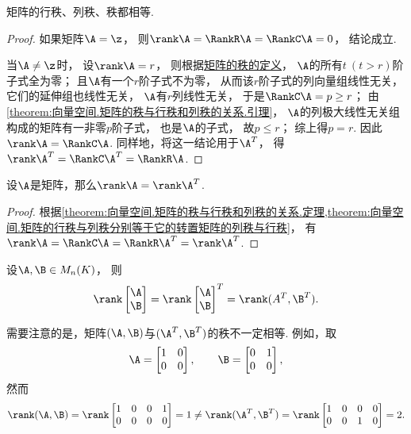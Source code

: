 \begin{theorem}\label{theorem:向量空间.矩阵的秩与行秩和列秩的关系.定理}
矩阵的行秩、列秩、秩都相等.
\begin{proof}
如果矩阵\(\A = \z\)，
则\(\rank\A=\RankR\A=\RankC\A=0\)，
结论成立.

当\(\A\neq\z\)时，
设\(\rank\A=r\)，
则根据\hyperref[definition:线性方程组.矩阵的秩的定义]{矩阵的秩的定义}，
\(\A\)的所有\(t\ (t > r)\)阶子式全为零；
且\(\A\)有一个\(r\)阶子式不为零，
从而该\(r\)阶子式的列向量组线性无关，
它们的延伸组也线性无关，
\(\A\)有\(r\)列线性无关，
于是\(\RankC\A=p \geq r\)；
由\cref{theorem:向量空间.矩阵的秩与行秩和列秩的关系.引理}，
\(\A\)的列极大线性无关组构成的矩阵有一非零\(p\)阶子式，
也是\(\A\)的子式，
故\(p \leq r\)；
综上得\(p = r\).
因此\(\rank\A=\RankC\A\).
同样地，将这一结论用于\(\A^T\)，
得\(\rank\A^T=\RankC\A^T=\RankR\A\).
\end{proof}
\end{theorem}

\begin{theorem}\label{theorem:向量空间.转置不变秩}
设\(\A\)是矩阵，那么\(\rank\A = \rank\A^T\).
\begin{proof}
根据\cref{theorem:向量空间.矩阵的秩与行秩和列秩的关系.定理,theorem:向量空间.矩阵的行秩与列秩分别等于它的转置矩阵的列秩与行秩}，
有\(\rank\A=\RankC\A=\RankR\A^T=\rank\A^T\).
\end{proof}
\end{theorem}

\begin{example}
设\(\A,\B \in M_n(K)\)，
则\[
	\rank\begin{bmatrix}
		\A \\ \B
	\end{bmatrix}
	= \rank\begin{bmatrix}
		\A \\ \B
	\end{bmatrix}^T
	= \rank(A^T,\B^T).
\]
\end{example}
\begin{remark}
需要注意的是，矩阵\((\A,\B)\)与\((\A^T,\B^T)\)的秩不一定相等.
例如，取\[
	\A = \begin{bmatrix}
		1 & 0 \\
		0 & 0
	\end{bmatrix},
	\qquad
	\B = \begin{bmatrix}
		0 & 1 \\
		0 & 0
	\end{bmatrix},
\]
然而\[
	\rank(\A,\B)
	= \rank\begin{bmatrix}
		1 & 0 & 0 & 1 \\
		0 & 0 & 0 & 0
	\end{bmatrix}
	= 1
	\neq
	\rank(\A^T,\B^T)
	= \rank\begin{bmatrix}
		1 & 0 & 0 & 0 \\
		0 & 0 & 1 & 0
	\end{bmatrix}
	= 2.
\]
\end{remark}


